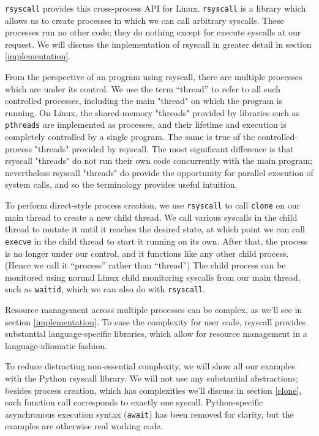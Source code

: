 \documentclass{acmart}
\begin{document}
\texttt{rsyscall} provides this cross-process API for Linux.
\texttt{rsyscall} is a library which allows us to create processes in which we can call arbitrary syscalls.
These processes run no other code; they do nothing except for execute syscalls at our request.
We will discuss the implementation of rsyscall in greater detail in section \ref{implementation}.

From the perspective of an program using rsyscall,
there are multiple processes which are under its control.
We use the term ``thread'' to refer to all such controlled processes,
including the main "thread" on which the program is running.
On Linux, the shared-memory "threads" provided by libraries such as \texttt{pthreads}
are implemented as processes,
and their lifetime and execution is completely controlled by a single program.
The same is true of the controlled-process "threads" provided by rsyscall.
The most significant difference is that rsyscall "threads"
do not run their own code concurrently with the main program;
nevertheless rsyscall "threads" do provide the opportunity for parallel execution of system calls,
and so the terminology provides useful intuition.

To perform direct-style process creation,
we use \texttt{rsyscall} to call \texttt{clone} on our main thread to create a new child thread.
We call various syscalls in the child thread to mutate it until it reaches the desired state,
at which point we can call \texttt{execve} in the child thread to start it running on its own.
After that, the process is no longer under our control, and it functions like any other child process.
(Hence we call it ``process'' rather than ``thread'')
The child process can be monitored using normal Linux child monitoring syscalls from our main thread,
such as \texttt{waitid},
which we can also do with \texttt{rsyscall}.

Resource management across multiple processes can be complex,
as we'll see in section \ref{implementation}.
To ease the complexity for user code,
rsyscall provides substantial language-specific libraries,
which allow for resource management in a language-idiomatic fashion.

To reduce distracting non-essential complexity,
we will show all our examples with the Python rsyscall library.
We will not use any substantial abstractions;
besides process creation, which has complexities we'll discuss in section \ref{clone},
each function call corresponds to exactly one syscall.
Python-specific asynchronous execution syntax (\texttt{await}) has been removed for clarity,
but the examples are otherwise real working code.
\end{document}
